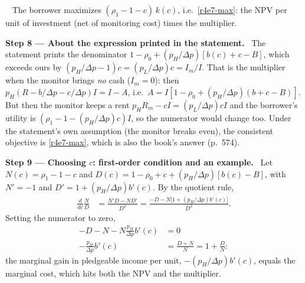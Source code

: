\documentclass[11pt,a4paper]{article}
\newcommand{\step}[2]{\par\medskip\noindent\textbf{Step #1 --- #2.}~}
\newcommand{\answer}[1]{\par\smallskip\noindent\fbox{\textbf{Answer #1.}}~}
\begin{document}
\answer{(ii-c)} The borrower maximizes $(\rho_1-1-c)\,k(c)$, i.e.\ \eqref{r4e7-max}: the NPV
per unit of investment (net of monitoring cost) times the multiplier.

\step{8}{About the expression printed in the statement} The statement prints the denominator
$1-\rho_0+(p_H/\Delta p)[b(c)+c-B]$, which exceeds ours by $(p_H/\Delta p-1)c=(p_L/\Delta p)c=I_m/I$.
That is the multiplier when the monitor brings \emph{no} cash ($I_m=0$): then
$p_H(R-b/\Delta p-c/\Delta p)I=I-A$, i.e.\ $A=I[1-\rho_0+(p_H/\Delta p)(b+c-B)]$. But then the
monitor keeps a rent $p_HR_m-cI=(p_L/\Delta p)cI$ and the borrower's utility is
$(\rho_1-1-(p_H/\Delta p)c)I$, so the numerator would change too. Under the statement's own
assumption (the monitor breaks even), the consistent objective is \eqref{r4e7-max}, which is
also the book's answer (p.~574).

\step{9}{Choosing $c$: first-order condition and an example} Let $N(c)=\rho_1-1-c$ and
$D(c)=1-\rho_0+c+(p_H/\Delta p)[b(c)-B]$, with $N'=-1$ and $D'=1+(p_H/\Delta p)b'(c)$. By the
quotient rule,
\begin{align}
  \frac{d}{dc}\frac{N}{D} &= \frac{N'D-ND'}{D^2} = \frac{-D-N\big[1+(p_H/\Delta p)b'(c)\big]}{D^2}. \nonumber
\end{align}
Setting the numerator to zero,
\begin{align}
  -D-N-N\frac{p_H}{\Delta p}b'(c) &= 0 \nonumber\\
  -\frac{p_H}{\Delta p}b'(c) &= \frac{D+N}{N} = 1+\frac{D}{N}: \label{r4e7-foc}
\end{align}
the marginal gain in pledgeable income per unit, $-(p_H/\Delta p)b'(c)$, equals the marginal
cost, which hits both the NPV and the multiplier.
\end{document}
